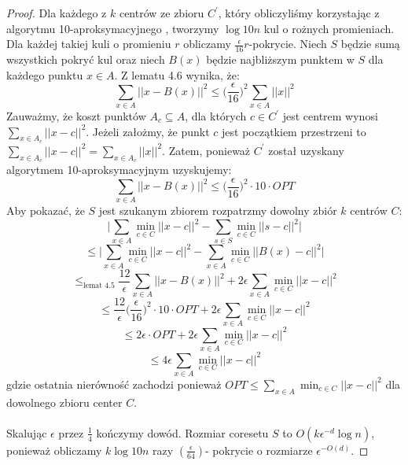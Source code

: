 \begin{proof}
    Dla każdego z $k$ centrów ze zbioru $C^{'}$, który obliczyliśmy korzystając z algorytmu 10-aproksymacyjnego \cite{Arya2004LocalSH}, tworzymy $\log 10n$ kul o rożnych promieniach.
    Dla każdej takiej kuli o promieniu $r$ obliczamy $\frac{\epsilon}{16}r$-pokrycie.
    Niech $S$ będzie sumą wszystkich pokryć kul oraz niech $B(x)$ będzie najbliższym punktem w $S$ dla każdego punktu $x \in A$.
    Z lematu 4.6 wynika, że:
    \begin{equation}
        \sum_{x\in A} ||x - B(x)||^{2} \leq \Big( \frac{\epsilon}{16} \Big)^{2} \sum_{x\in A} ||x||^{2}
    \end{equation}
    Zauważmy, że koszt punktów $A_{c} \subseteq A$, dla których $c \in C^{'}$ jest centrem wynosi $\sum_{x\in A_{c}} ||x - c||^{2}$.
    Jeżeli założmy, że punkt $c$ jest początkiem przestrzeni to $\sum_{x\in A_{c}} ||x - c||^{2} = \sum_{x\in A_{c}} ||x||^{2}$.
    Zatem, ponieważ $C^{'}$ został uzyskany algorytmem 10-aproksymacyjnym uzyskujemy:
    \begin{equation}
        \sum_{x\in A} ||x - B(x)||^{2} \leq \Big( \frac{\epsilon}{16} \Big)^{2} \cdot 10 \cdot OPT
    \end{equation}
    Aby pokazać, że $S$ jest szukanym zbiorem rozpatrzmy dowolny zbiór $k$ centrów $C$:
    \begin{equation}
        \Big|\sum_{x\in A} \min_{c \in C} ||x - c||^{2} - \sum_{s\in S} \min_{c \in C} ||s - c||^{2}\Big|
    \end{equation}
    \begin{equation}
        \leq\Big|\sum_{x\in A} \min_{c \in C} ||x - c||^{2} - \sum_{x\in A} \min_{c \in C} ||B(x) - c||^{2}\Big|
    \end{equation}
    \begin{equation}
        \leq_{\text{lemat 4.5}} \frac{12}{\epsilon} \sum_{x\in A} ||x - B(x)||^{2} + 2\epsilon \sum_{x\in A} \min_{c \in C} ||x - c||^{2}
    \end{equation}
    \begin{equation}
        \leq \frac{12}{\epsilon} \Big( \frac{\epsilon}{16} \Big)^{2} \cdot 10 \cdot OPT + 2\epsilon \sum_{x\in A} \min_{c \in C} ||x - c||^{2}
    \end{equation}
    \begin{equation}
        \leq 2\epsilon \cdot OPT + 2\epsilon \sum_{x\in A} \min_{c \in C} ||x - c||^{2}
    \end{equation}
    \begin{equation}
        \leq 4\epsilon \sum_{x\in A} \min_{c \in C} ||x - c||^{2}
    \end{equation}
    gdzie ostatnia nierówność zachodzi ponieważ $OPT \leq \sum_{x\in A} \min_{c \in C} ||x - c||^{2}$ dla dowolnego zbioru center $C$.
    \\~\\
    Skalując $\epsilon$ przez $\frac{1}{4}$ kończymy dowód.
    Rozmiar coresetu $S$ to $O(k\epsilon^{-d} \log n)$, ponieważ obliczamy $k \log 10n$ razy $(\frac{\epsilon}{64})$- pokrycie o rozmiarze $\epsilon^{-O(d)}$.
\end{proof}

